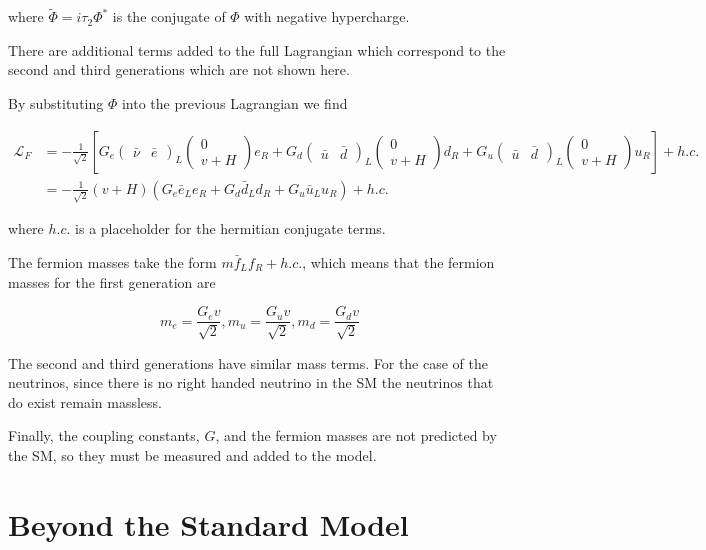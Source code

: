 	where $\tilde{\Phi}=i\tau_{2}\Phi^{*}$ is the conjugate of $\Phi$ with negative hypercharge.

	There are additional terms added to the full Lagrangian which correspond to the second and third generations which are not shown here.

	By substituting $\Phi$ into the previous Lagrangian we find

		\begin{align}
		\mathcal{L}_{F} &= -\frac{1}{\sqrt{2}}[G_{e}\begin{pmatrix} \bar{\nu} & \bar{e} \end{pmatrix}_{L}\begin{pmatrix} 0 \\ v+H \end{pmatrix}e_{R}+G_{d}\begin{pmatrix}\bar{u} & \bar{d}\end{pmatrix}_{L}\begin{pmatrix} 0 \\ v+H \end{pmatrix}d_{R} + G_{u}\begin{pmatrix}\bar{u} & \bar{d}\end{pmatrix}_{L}\begin{pmatrix} 0 \\ v+H \end{pmatrix}u_{R}] + h.c. \\
		&= -\frac{1}{\sqrt{2}}(v+H)(G_{e}\bar{e}_{L}e_{R}+G_{d}\bar{d}_{L}d_{R}+G_{u}\bar{u}_{L}u_{R})+h.c. 
		\end{align}

	where $h.c.$ is a placeholder for the hermitian conjugate terms. 

	The fermion masses take the form $m\bar{f}_{L}f_{R} + h.c.$, which means that the fermion masses for the first generation are

		\begin{equation}
		m_{e} = \frac{G_{e}v}{\sqrt{2}}, m_{u}=\frac{G_{u}v}{\sqrt{2}}, m_{d}=\frac{G_{d}v}{\sqrt{2}} 
		\end{equation}

	The second and third generations have similar mass terms. For the case of the neutrinos, since there is no right handed neutrino in the SM the neutrinos that do exist remain massless.
	
	Finally, the coupling constants, $G$, and the fermion masses are not predicted by the SM, so they must be measured and added to the model.

\section{Beyond the Standard Model}

